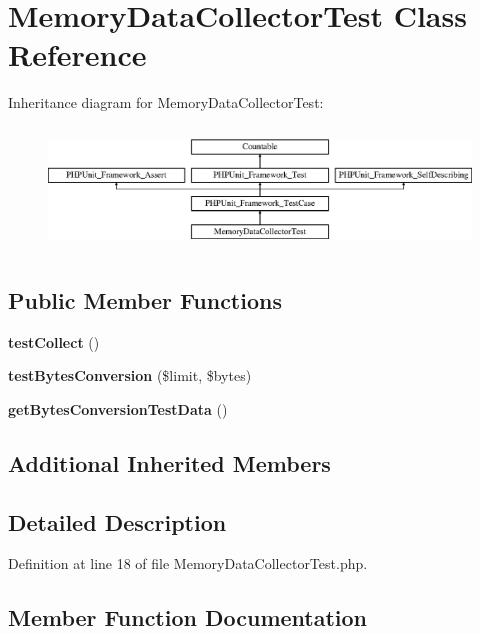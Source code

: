 \section{Memory\+Data\+Collector\+Test Class Reference}
\label{class_symfony_1_1_component_1_1_http_kernel_1_1_tests_1_1_data_collector_1_1_memory_data_collector_test}
Inheritance diagram for Memory\+Data\+Collector\+Test\+:\begin{figure}[H]
\begin{center}
\leavevmode
\includegraphics[height=3.303835cm]{class_symfony_1_1_component_1_1_http_kernel_1_1_tests_1_1_data_collector_1_1_memory_data_collector_test}
\end{center}
\end{figure}
\subsection*{Public Member Functions}
\begin{DoxyCompactItemize}
\item 
{\bf test\+Collect} ()
\item 
{\bf test\+Bytes\+Conversion} (\$limit, \$bytes)
\item 
{\bf get\+Bytes\+Conversion\+Test\+Data} ()
\end{DoxyCompactItemize}
\subsection*{Additional Inherited Members}


\subsection{Detailed Description}


Definition at line 18 of file Memory\+Data\+Collector\+Test.\+php.



\subsection{Member Function Documentation}
